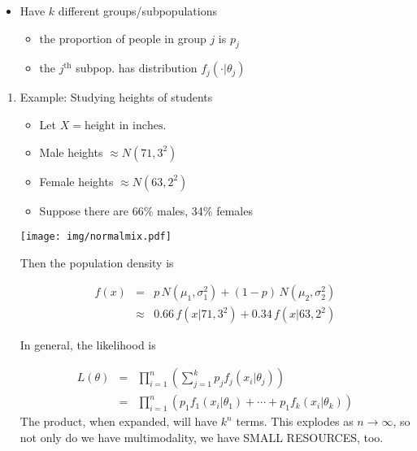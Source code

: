 \documentclass[11pt,english]{scrbook}
\begin{document}
\begin{itemize}
\item Have \(k\) different groups/subpopulations
\begin{itemize}
\item the proportion of people in group \(j\) is \(p_{j}\)
\item the \(j^{\mathrm{th}}\) subpop. has distribution \(f_{j}(\cdot |\theta_{j})\)
\end{itemize}
\end{itemize}

\begin{enumerate}
\item Example: Studying heights of students
\label{sec:orgb8fd12b}
\begin{itemize}
\item Let \(X = \mbox{height in inches}\).
\item Male heights \(\approx N(71, 3^2)\)
\item Female heights \(\approx N(63, 2^2)\)
\item Suppose there are 66\% males, 34\% females
\end{itemize}

\begin{center}
\begin{center}
\texttt{[image: img/normalmix.pdf]}
\end{center}

\end{center}

Then the population density is 

\begin{eqnarray*}
f(x) & = & p\,N(\mu_{1},\sigma_{1}^{2}) + (1 - p)\,N(\mu_{2},\sigma_{2}^{2})\\
     & \approx & 0.66\,f(x|71, 3^{2}) + 0.34\,f(x|63,2^{2})
\end{eqnarray*}

In general, the likelihood is 

\begin{eqnarray*}
L(\theta) & = & \prod_{i=1}^{n} \left( \sum_{j=1}^{k}p_{j}f_{j}(x_{i}|\theta_{j}) \right) \\
     & = & \prod_{i=1}^{n} \left( p_{1}f_{1}(x_{i}|\theta_{1}) + \cdots + p_{1}f_{k}(x_{i}|\theta_{k}) \right)
\end{eqnarray*}
The product, when expanded, will have \(k^{n}\) terms.  This explodes as \(n \to \infty\), so not only do we have multimodality, we have SMALL RESOURCES, too.
\end{enumerate}
\end{document}
